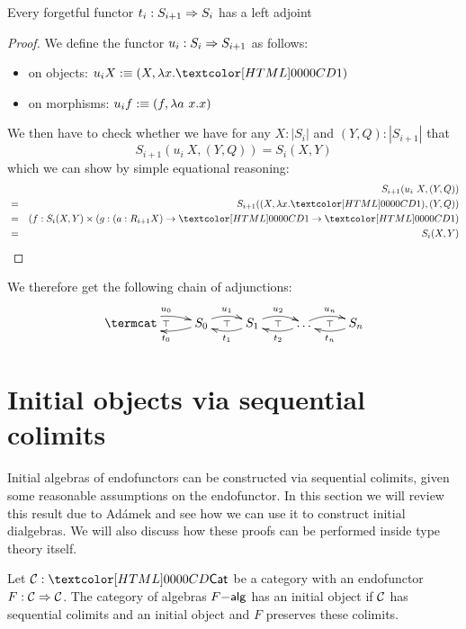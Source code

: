 \begin{proposition}
Every forgetful functor $t_i : S_{i+1} \Rightarrow S_i$ has a left adjoint
\end{proposition}

\begin{proof}
  We define the functor $u_i : S_i \Rightarrow S_{i+1}$ as follows:
  \begin{itemize}
  \item on objects: $u_i X \ddefeq (X , \lambda x . \unitty)$
  \item on morphisms: $u_i f :\equiv (f , \lambda a\ x . x)$
  \end{itemize}
  We then have to check whether we have for any $X : | S_i |$ and
  $(Y,Q) : | S_{i+1} |$ that
  $$
  S_{i+1}(u_i\ X , (Y,Q)) = S_i(X,Y)
  $$
  which we can show by simple equational reasoning:
  \begin{align*}
      &&S_{i+1}(u_i\ X , (Y,Q)) \\
    &=& S_{i+1}((X,\lambda x . \unitty), (Y,Q)) \\
    &=& (f : S_i(X,Y) \times (g : (a : R_{i+1} X) \to \unitty \to \unitty) \\
    &=& S_i(X,Y)
  \end{align*}

\end{proof}

We therefore get the following chain of adjunctions:
$$
\xymatrix{
\termcat \ar@/^/[r]^{u_0}
\ar@{}[r]|{\top} 
&S_0 \ar@/^/[l]^{t_0} \ar@/^/[r]^{u_1} 
\ar@{}[r]|{\top} 
&S_1 \ar@/^/[l]^{t_1} \ar@/^/[r]^{u_2} 
\ar@{}[r]|{\top} 
&\hdots \ar@/^/[l]^{t_2} \ar@/^/[r]^{u_n} 
\ar@{}[r]|{\top} 
&S_n \ar@/^/[l]^{t_n}
}
$$


\section{Initial objects via sequential colimits}
\label{sequential-colimits}

Initial algebras of endofunctors can be constructed via sequential
colimits, given some reasonable assumptions on the endofunctor. In
this section we will review this result due to Ad\'amek and see how we
can use it to construct initial dialgebras. We will also discuss how
these proofs can be performed inside type theory itself.

\begin{theorem}[Ad\'amek]
  \label{adamek-thm}
  Let $\Cc : \Cat$ be a category with an endofunctor
  $F : \mathcal{C} \Rightarrow \mathcal{C}$. The category of algebras $F\mathsf{-alg}$ has an
  initial object if $\mathcal{C}$ has sequential colimits and an initial
  object and $F$ preserves these colimits.
\end{theorem}

